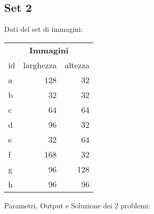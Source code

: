 
	\subsection{Set 2}
Dati del set di immagini:  \\

\begin{table}[H]
\centering
\footnotesize
\begin{tabular}{l|r|r}
\multicolumn{3}{c}{\textbf{Immagini}} \\ 
id & larghezza & altezza \\
\hline
a & 128 & 32 \\
b & 32&32\\
c & 64& 64\\
d & 96&32\\
e & 32&64\\
f & 168 &32\\
g & 96&128\\
h & 96& 96\\
\end{tabular}
\end{table}


\noindent Parametri, Output e Soluzione dei 2 problemi: 

